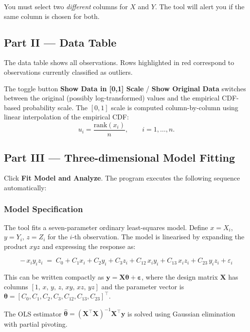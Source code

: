 \documentclass[12pt,a4paper]{article}
\begin{document}
\begin{warnbox}
    You must select two \emph{different} columns for $X$ and $Y$.  The tool will
    alert you if the same column is chosen for both.
\end{warnbox}

\subsection{Part II --- Data Table}

The data table shows all observations.  Rows highlighted in red correspond to
observations currently classified as outliers.

The toggle button \textbf{Show Data in [0,1] Scale} / \textbf{Show Original Data}
switches between the original (possibly log-transformed) values and the empirical
CDF-based probability scale.  The $[0,1]$ scale is computed column-by-column using
linear interpolation of the empirical CDF:
\[
    u_i = \frac{\text{rank}(x_i)}{n}, \qquad i = 1, \dots, n.
\]

\subsection{Part III --- Three-dimensional Model Fitting}

Click \textbf{Fit Model and Analyze}.  The program executes the following sequence
automatically:

\subsubsection{Model Specification}

The tool fits a seven-parameter ordinary least-squares model.  Define
$x = X_i$, $y = Y_i$, $z = Z_i$ for the $i$-th observation.  The model is
linearised by expanding the product $xyz$ and expressing the response as:

\[
    -\,x_i y_i z_i \;=\;
    C_0
    + C_1 x_i
    + C_2 y_i
    + C_3 z_i
    + C_{12}\,x_i y_i
    + C_{13}\,x_i z_i
    + C_{23}\,y_i z_i
    + \varepsilon_i
\]

This can be written compactly as $\mathbf{y} = \mathbf{X}\boldsymbol{\theta} + \boldsymbol{\varepsilon}$,
where the design matrix $\mathbf{X}$ has columns
$[1,\, x,\, y,\, z,\, xy,\, xz,\, yz]$ and the parameter vector is
$\boldsymbol{\theta} = [C_0, C_1, C_2, C_3, C_{12}, C_{13}, C_{23}]^\top$.

The OLS estimator $\hat{\boldsymbol{\theta}} = (\mathbf{X}^\top\mathbf{X})^{-1}\mathbf{X}^\top\mathbf{y}$
is solved using Gaussian elimination with partial pivoting.
\end{document}
